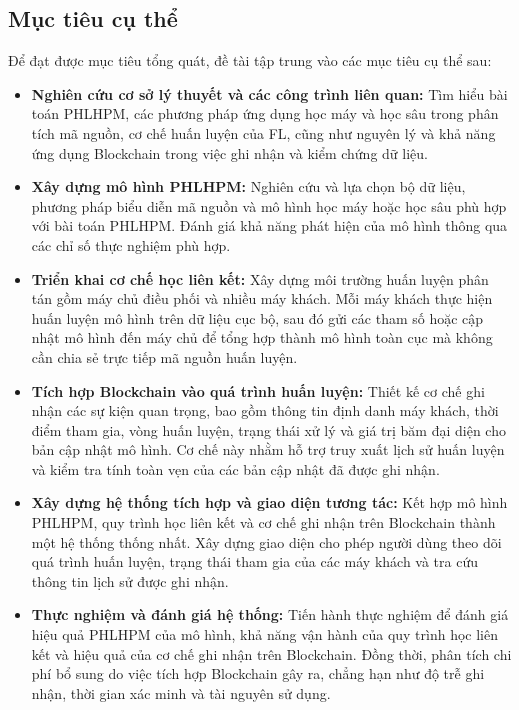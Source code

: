 \subsection{Mục tiêu cụ thể}

Để đạt được mục tiêu tổng quát, đề tài tập trung vào các mục tiêu cụ thể sau:

\begin{itemize}

	\item \textbf{ Nghiên cứu cơ sở lý thuyết và các công trình liên quan: } Tìm hiểu bài toán \ac{PHLHPM}, các phương pháp ứng dụng học máy và học sâu trong phân tích mã nguồn, cơ chế huấn luyện của \ac{FL}, cũng như nguyên lý và khả năng ứng dụng Blockchain trong việc ghi nhận và kiểm chứng dữ liệu.

	\item \textbf{ Xây dựng mô hình \ac{PHLHPM}: } Nghiên cứu và lựa chọn bộ dữ liệu, phương pháp biểu diễn mã nguồn và mô hình học máy hoặc học sâu phù hợp với bài toán \ac{PHLHPM}. Đánh giá khả năng phát hiện của mô hình thông qua các chỉ số thực nghiệm phù hợp.

	\item \textbf{ Triển khai cơ chế học liên kết: } Xây dựng môi trường huấn luyện phân tán gồm máy chủ điều phối và nhiều máy khách. Mỗi máy khách thực hiện huấn luyện mô hình trên dữ liệu cục bộ, sau đó gửi các tham số hoặc cập nhật mô hình đến máy chủ để tổng hợp thành mô hình toàn cục mà không cần chia sẻ trực tiếp mã nguồn huấn luyện.

	\item \textbf{ Tích hợp Blockchain vào quá trình huấn luyện: } Thiết kế cơ chế ghi nhận các sự kiện quan trọng, bao gồm thông tin định danh máy khách, thời điểm tham gia, vòng huấn luyện, trạng thái xử lý và giá trị băm đại diện cho bản cập nhật mô hình. Cơ chế này nhằm hỗ trợ truy xuất lịch sử huấn luyện và kiểm tra tính toàn vẹn của các bản cập nhật đã được ghi nhận.

	\item \textbf{ Xây dựng hệ thống tích hợp và giao diện tương tác: } Kết hợp mô hình \ac{PHLHPM}, quy trình học liên kết và cơ chế ghi nhận trên Blockchain thành một hệ thống thống nhất. Xây dựng giao diện cho phép người dùng theo dõi quá trình huấn luyện, trạng thái tham gia của các máy khách và tra cứu thông tin lịch sử được ghi nhận.

	\item \textbf{ Thực nghiệm và đánh giá hệ thống: } Tiến hành thực nghiệm để đánh giá hiệu quả \ac{PHLHPM} của mô hình, khả năng vận hành của quy trình học liên kết và hiệu quả của cơ chế ghi nhận trên Blockchain. Đồng thời, phân tích chi phí bổ sung do việc tích hợp Blockchain gây ra, chẳng hạn như độ trễ ghi nhận, thời gian xác minh và tài nguyên sử dụng.

\end{itemize}
